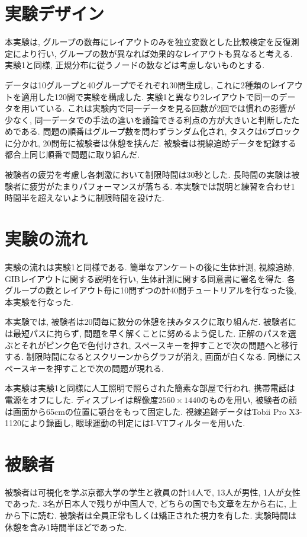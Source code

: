 \documentclass{kuee}
\begin{document}
\section{実験デザイン}
\label{sec:ex2-design}
本実験は, グループの数毎にレイアウトのみを独立変数とした比較検定を反復測定により行い, グループの数が異なれば効果的なレイアウトも異なると考える.
実験1と同様, 正規分布に従うノードの数などは考慮しないものとする.

データは10グループと40グループでそれぞれ30問生成し, これに2種類のレイアウトを適用した120問で実験を構成した.
実験1と異なり2レイアウトで同一のデータを用いている.
これは実験内で同一データを見る回数が2回では慣れの影響が少なく, 同一データでの手法の違いを議論できる利点の方が大きいと判断したためである.
問題の順番はグループ数を問わずランダム化され, タスクは6ブロックに分かれ, 20問毎に被験者は休憩を挟んだ.
被験者は視線追跡データを記録する都合上同じ順番で問題に取り組んだ.

被験者の疲労を考慮し各刺激において制限時間は30秒とした.
長時間の実験は被験者に疲労がたまりパフォーマンスが落ちる.
本実験では説明と練習を合わせ1時間半を超えないように制限時間を設けた.

\section{実験の流れ}
実験の流れは実験1と同様である.
簡単なアンケートの後に生体計測, 視線追跡, GIBレイアウトに関する説明を行い, 生体計測に関する同意書に署名を得た.
各グループの数とレイアウト毎に10問ずつの計40問チュートリアルを行なった後, 本実験を行なった.

本実験では, 被験者は20問毎に数分の休憩を挟みタスクに取り組んだ.
被験者には最短パスに拘らず, 問題を早く解くことに努めるよう促した.
正解のパスを選ぶとそれがピンク色で色付けされ, スペースキーを押すことで次の問題へと移行する.
制限時間になるとスクリーンからグラフが消え, 画面が白くなる.
同様にスペースキーを押すことで次の問題が現れる.

本実験は実験1と同様に人工照明で照らされた簡素な部屋で行われ, 携帯電話は電源をオフにした.
ディスプレイは解像度$2560 \times 1440$のものを用い, 被験者の顔は画面から65cmの位置に顎台をもって固定した.
視線追跡データはTobii Pro X3-1120により録画し, 眼球運動の判定にはI-VTフィルター\cite{olsen2012tobii}を用いた.

\section{被験者}
被験者は可視化を学ぶ京都大学の学生と教員の計14人で, 13人が男性, 1人が女性であった.
3名が日本人で残りが中国人で, どちらの国でも文章を左から右に, 上から下に読む.
被験者は全員正常もしくは矯正された視力を有した.
実験時間は休憩を含み1時間半ほどであった.
\end{document}
